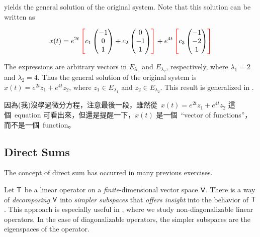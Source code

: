yields the general solution of the original system.
Note that this solution can be written as

\begin{align*}
    x(t) = e^{2 t} \cleft[red][
        c_{1}\begin{pmatrix} -1 \\ 0 \\ 1 \end{pmatrix}
        + c_{2} \begin{pmatrix} 0 \\ -1 \\ 1 \end{pmatrix}
    \cright[red]]
    + e^{4 t} \cleft[red][
        c_{3} \begin{pmatrix} -1 \\ -2 \\ 1 \end{pmatrix}
    \cright[red]]
\end{align*}

The expressions \emph{} are arbitrary vectors in \(E_{\lambda_1}\) and \(E_{\lambda_2}\), respectively,
where \(\lambda_1 = 2\) and \(\lambda_2 = 4\).
Thus the general solution of the original system is \(x(t) = e^{2t} z_1 + e^{4t} z_2\),
where \(z_1 \in E_{\lambda_1}\) and \(z_2 \in E_{\lambda_2}\).
This result is generalized in .

\begin{note}
因為(我)沒學過微分方程，注意最後一段，雖然從\ \(x(t) = e^{2t} z_1 + e^{4t} z_2\) 這個\ equation 可看出來，但還是提醒一下，\(x(t)\) 是一個\ ``vector of functions''，而不是一個\ function。
\end{note}

\subsection{Direct Sums} \label{sec 5.2.3}

\begin{note}
The concept of direct sum has occurred in many previous exercises.
\end{note}

Let \(\textsf{T}\) be a linear operator on a \emph{finite}-dimensional vector space \(\textsf{V}\).
There is a way of \emph{decomposing} \(\textsf{V}\) into \emph{simpler subspaces} that \emph{offers insight} into the behavior of \(\textsf{T}\).
This approach is especially useful in , where we study non-diagonalizable linear operators.
In the case of diagonalizable operators, the simpler subspaces are the eigenspaces of the operator.

